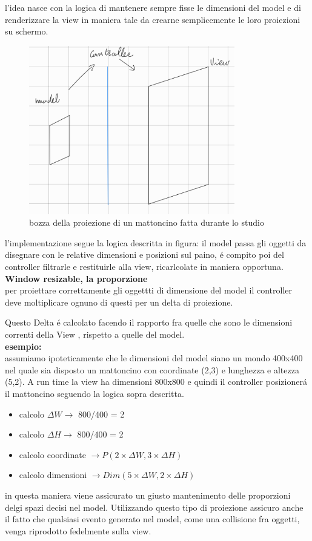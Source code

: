 \documentclass[a4paper,12pt]{report}
\begin{document}
l'idea nasce con la logica di mantenere sempre fisse le dimensioni del model
e di renderizzare la view in maniera tale da crearne semplicemente le loro proiezioni su schermo.
\begin{figure}[H]
    \centering
    \includegraphics[width=0.8\textwidth]{images/resizableConcept.png}
    \caption{bozza della proiezione di un mattoncino fatta durante lo studio}
\end{figure}
l'implementazione segue la logica descritta in figura: il model passa gli oggetti da disegnare con le
relative dimensioni e posizioni sul paino, é compito poi del controller filtrarle e restituirle alla view,
ricarlcolate in maniera opportuna.\\
\textbf{Window resizable, la proporzione}\\
per proiettare correttamente gli oggettti di dimensione del model il controller deve moltiplicare ognuno
di questi per un delta di proiezione.

Questo Delta é calcolato facendo il rapporto fra quelle che sono le dimensioni correnti della View , rispetto
a quelle del model.\\
\textbf{esempio:} \\
assumiamo ipoteticamente che le dimensioni del model siano un mondo 400x400 nel quale sia disposto un mattoncino
con coordinate (2,3) e lunghezza e altezza (5,2).
A run time la view ha dimensioni 800x800  e quindi il controller posizionerá il mattoncino seguendo la logica
sopra descritta.\\
\begin{itemize}
    \item calcolo $\Delta W \rightarrow$  800/400 = 2
    \item calcolo $\Delta H \rightarrow$  800/400 = 2
    \item calcolo coordinate $\rightarrow P(2 \times \Delta W, 3\times \Delta H)$
    \item calcolo dimensioni $\rightarrow Dim(5 \times \Delta W,2\times \Delta H)$
\end{itemize}
in questa maniera viene assicurato un giusto mantenimento delle proporzioni delgi spazi decisi nel model.
Utilizzando questo tipo di proiezione assicuro anche il fatto che qualsiasi evento generato nel model, come una
collisione fra oggetti, venga riprodotto fedelmente sulla view.
\end{document}
